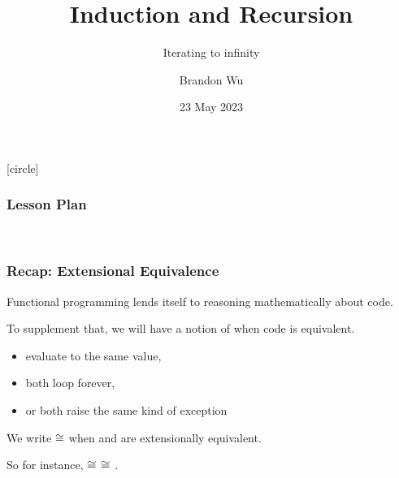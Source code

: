\documentclass[aspectratio=169]{beamer}
\title{Induction and Recursion} %
\subtitle{Iterating to infinity} %
\date{23 May 2023} %
\author{Brandon Wu} %
\newif\ifcolorlambda
\begin{document}
\ifweb
    \renewcommand{\pause}{}
\fi

[circle]

{
\begin{frame}[plain]
    \colorlambdatrue
    \titlepage
\end{frame}
}

\begin{frame}[fragile]
  \frametitle{Lesson Plan}

  \tableofcontents
\end{frame}


\begin{frame}[plain]
  \begin{center}
    \huge \color{presentColor}  \\
    \vspace{10pt}
    \large \color{presentColor} 
  \end{center}
\end{frame}

\begin{frame}[fragile]
  \frametitle{Recap: Extensional Equivalence}

  Functional programming lends itself to reasoning mathematically about code.

  \pause
  \vspace{5pt}

  To supplement that, we will have a notion of when code is equivalent.

  \pause
  \vspace{\fill}

  \begin{itemize}
    \item evaluate to the same value,
    \item both loop forever,
    \item or both raise the same kind of exception
  \end{itemize}

  \pause
  \vspace{5pt}

  We write  $\cong$  when  and  are extensionally equivalent.

  \vspace{\fill}

  So for instance,  $\cong$  $\cong$ .
\end{frame}
\end{document}
